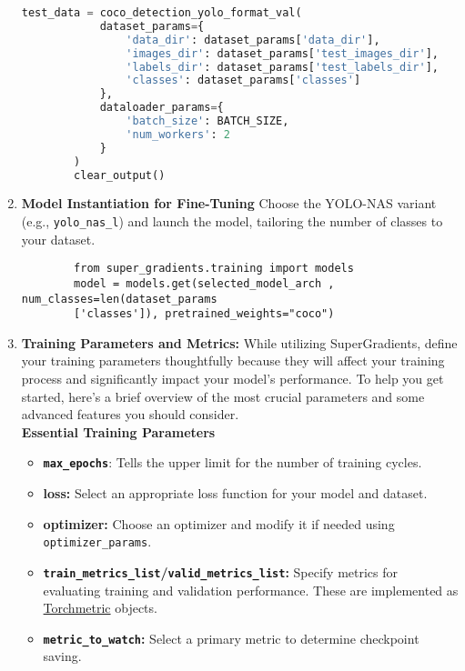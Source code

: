 \begin{enumerate}
\begin{lstlisting}[language=Python, caption=Setting-Up Dataloaders]
        test_data = coco_detection_yolo_format_val(
            dataset_params={
                'data_dir': dataset_params['data_dir'],
                'images_dir': dataset_params['test_images_dir'],
                'labels_dir': dataset_params['test_labels_dir'],
                'classes': dataset_params['classes']
            },
            dataloader_params={
                'batch_size': BATCH_SIZE,
                'num_workers': 2
            }
        )
        clear_output()
     \end{lstlisting}
     \item \textbf{Model Instantiation for Fine-Tuning}
     Choose the YOLO-NAS variant (e.g., \texttt{yolo\_nas\_l}) and launch the model, tailoring the number of classes to your dataset.
     \begin{lstlisting}
        from super_gradients.training import models
        model = models.get(selected_model_arch , num_classes=len(dataset_params
        ['classes']), pretrained_weights="coco")
     \end{lstlisting}
    \item \textbf{Training Parameters and Metrics: } While utilizing SuperGradients, define your training parameters thoughtfully because they will affect your training process and significantly impact your model's performance. To help you get started, here's a brief overview of the most crucial parameters and some advanced features you should consider. \cite{supergradients}\\
    
    \textbf{Essential Training Parameters}\\
    \begin{itemize}
        \item \textbf{\texttt{max\_epochs}}: Tells the upper limit for the number of training cycles.\\
        \item \textbf{loss: } Select an appropriate loss function for your model and dataset. \\
        \item \textbf{optimizer: } Choose an optimizer and modify it if needed using \texttt{optimizer\_params}.\\
        \item \textbf{\texttt{train\_metrics\_list}/\texttt{valid\_metrics\_list}: } Specify metrics for evaluating training and validation performance. These are implemented as \href{https://lightning.ai/docs/torchmetrics/stable/}{Torchmetric} objects. \\
        \item \textbf{\texttt{metric\_to\_watch}: } Select a primary metric to determine checkpoint saving. \\
    \end{itemize} 
    

\end{enumerate}
